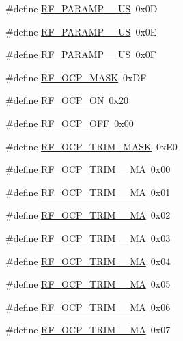 \begin{DoxyCompactItemize}
\item 
\#define \hyperlink{sx1276Regs-Fsk_8h_a035bf0812a1b3171b3ca7ccebfe71deb}{R\+F\+\_\+\+P\+A\+R\+A\+M\+P\+\_\+\_\+\+US}~0x0D
\item 
\#define \hyperlink{sx1276Regs-Fsk_8h_abca7fd114ba58b4640c3662519e2c713}{R\+F\+\_\+\+P\+A\+R\+A\+M\+P\+\_\+\_\+\+US}~0x0E
\item 
\#define \hyperlink{sx1276Regs-Fsk_8h_a7863d94d5d9cbd4b3fa8ba21da2c1d2d}{R\+F\+\_\+\+P\+A\+R\+A\+M\+P\+\_\+\_\+\+US}~0x0F
\item 
\#define \hyperlink{sx1276Regs-Fsk_8h_a647861589ac95c5f1dc957e8050efd1c}{R\+F\+\_\+\+O\+C\+P\+\_\+\+M\+A\+SK}~0x\+DF
\item 
\#define \hyperlink{sx1276Regs-Fsk_8h_a88bfe34637e386be3c38ce7ff1a9eed1}{R\+F\+\_\+\+O\+C\+P\+\_\+\+ON}~0x20
\item 
\#define \hyperlink{sx1276Regs-Fsk_8h_adcad32407684d268946ce3928213a966}{R\+F\+\_\+\+O\+C\+P\+\_\+\+O\+FF}~0x00
\item 
\#define \hyperlink{sx1276Regs-Fsk_8h_a01f3bea912fa624b72dc713e92fd4b05}{R\+F\+\_\+\+O\+C\+P\+\_\+\+T\+R\+I\+M\+\_\+\+M\+A\+SK}~0x\+E0
\item 
\#define \hyperlink{sx1276Regs-Fsk_8h_a100553bbc898d5cfcaf0c5f0ee8e1ac1}{R\+F\+\_\+\+O\+C\+P\+\_\+\+T\+R\+I\+M\+\_\+\_\+\+MA}~0x00
\item 
\#define \hyperlink{sx1276Regs-Fsk_8h_ae63185fb50f27713e94bc100dff0f991}{R\+F\+\_\+\+O\+C\+P\+\_\+\+T\+R\+I\+M\+\_\+\_\+\+MA}~0x01
\item 
\#define \hyperlink{sx1276Regs-Fsk_8h_ae614e18d5387cbdda89f9a375f76eac6}{R\+F\+\_\+\+O\+C\+P\+\_\+\+T\+R\+I\+M\+\_\+\_\+\+MA}~0x02
\item 
\#define \hyperlink{sx1276Regs-Fsk_8h_a7ba90fa227a1b2b43ae699d0e89b1ed5}{R\+F\+\_\+\+O\+C\+P\+\_\+\+T\+R\+I\+M\+\_\+\_\+\+MA}~0x03
\item 
\#define \hyperlink{sx1276Regs-Fsk_8h_a71a92d9741db30ff30e3f262438ae62f}{R\+F\+\_\+\+O\+C\+P\+\_\+\+T\+R\+I\+M\+\_\+\_\+\+MA}~0x04
\item 
\#define \hyperlink{sx1276Regs-Fsk_8h_aa66596103d632808f6927635cb4049f1}{R\+F\+\_\+\+O\+C\+P\+\_\+\+T\+R\+I\+M\+\_\+\_\+\+MA}~0x05
\item 
\#define \hyperlink{sx1276Regs-Fsk_8h_a9fc05aaa1ed0f566c01aff24164080aa}{R\+F\+\_\+\+O\+C\+P\+\_\+\+T\+R\+I\+M\+\_\+\_\+\+MA}~0x06
\item 
\#define \hyperlink{sx1276Regs-Fsk_8h_ad91d8ca7ffc7866cec37af6b3cefeb91}{R\+F\+\_\+\+O\+C\+P\+\_\+\+T\+R\+I\+M\+\_\+\_\+\+MA}~0x07

\end{DoxyCompactItemize}
